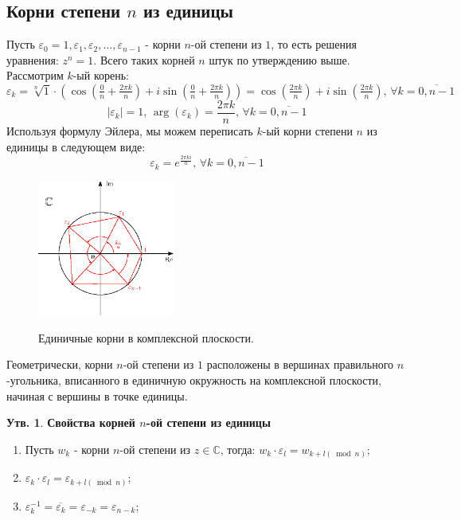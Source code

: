 \documentclass[12pt]{article}
\newcommand{\MC}{\mathbb{C}}
\newcommand{\VE}{\varepsilon}
\theoremstyle{definition}
\newtheorem{prop}{Утв.}
\newcommand{\ovl}[1]{\overline{#1}}
\begin{document}
\subsection*{Корни степени $n$ из единицы}
Пусть $\VE_0 = 1, \VE_1, \VE_2, \dotsc, \VE_{n-1}$ - корни $n$-ой степени из $1$, то есть решения уравнения: $z^n = 1$. Всего таких корней $n$ штук по утверждению выше. Рассмотрим $k$-ый корень:
$$
	\VE_k = \sqrt[n]{1}{\cdot}\left(\cos\left(\tfrac{0}{n} + \tfrac{2\pi k}{n}\right) + i \sin\left(\tfrac{0}{n} + \tfrac{2\pi k}{n}\right) \right) = \cos\left(\tfrac{2\pi k}{n}\right) + i\sin\left(\tfrac{2\pi k}{n}\right), \, \forall k =\overline{0, n-1}
$$
$$
	|\VE_k| = 1, \, \arg(\VE_k) = \dfrac{2\pi k}{n}, \, \forall k =\overline{0, n-1}
$$
Используя формулу Эйлера, мы можем переписать $k$-ый корни степени $n$ из единицы в следующем виде:
$$
	\VE_k = e^{\tfrac{2\pi k i}{n}}, \, \forall k =\overline{0, n-1}
$$
\begin{figure}[H]
	\centering
	\includegraphics[width=0.4\textwidth]{AL1L14_4.eps}
	\label{AL1L14_4}
	\caption{Единичные корни в комплексной плоскости.}
\end{figure}
Геометрически, корни $n$-ой степени из $1$ расположены в вершинах правильного $n$-угольника, вписанного в единичную окружность на комплексной плоскости, начиная с вершины в точке единицы.
\newpage
\begin{prop}
	\textbf{Свойства корней $n$-ой степени из единицы}
	\begin{enumerate}[label=\arabic*)]
		\item Пусть $w_k$ - корни $n$-ой степени из $z \in \MC$, тогда: $w_k{\cdot}\VE_l = w_{k + l (\bmod n)}$;
		\item $\VE_k{\cdot}\VE_l = \VE_{k + l (\bmod n)}$;
		\item $\VE_k^{-1} = \ovl{\VE_k} = \VE_{-k} = \VE_{n-k}$;
	\end{enumerate}
\end{prop}
\end{document}
